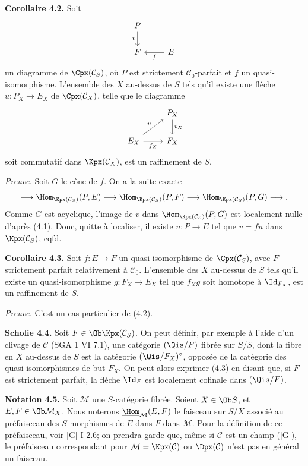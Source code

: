 \documentclass[11pt]{article}
\begin{document}
\textbf{Corollaire 4.2.} Soit
\[
\begin{tikzcd}
P \arrow[d,"v"'] \\
F & E \arrow[l,"f"]
\end{tikzcd}
\]
un diagramme de \(\Cpx(\mathcal C_S)\), où \(P\) est strictement \(\mathcal C_0\)-parfait et \(f\) un quasi-isomorphisme. L'ensemble des \(X\) au-dessus de \(S\) tels qu'il existe une flèche \(u:P_X\to E_X\) de \(\Cpx(\mathcal C_X)\), telle que le diagramme
\[
\begin{tikzcd}
& P_X \arrow[d,"v_X"]\\
E_X \arrow[r,"f_X"'] \arrow[ur,"u"] & F_X
\end{tikzcd}
\]
soit commutatif dans \(\Kpx(\mathcal C_X)\), est un raffinement de \(S\).

\emph{Preuve.} Soit \(G\) le cône de \(f\). On a la suite exacte
\[
  \longrightarrow \Hom_{\Kpx(\mathcal C_S)}(P,E)
  \longrightarrow \Hom_{\Kpx(\mathcal C_S)}(P,F)
  \longrightarrow \Hom_{\Kpx(\mathcal C_S)}(P,G)
  \longrightarrow .
\]
Comme \(G\) est acyclique, l'image de \(v\) dans \(\Hom_{\Kpx(\mathcal C_S)}(P,G)\) est localement nulle d'après (4.1). Donc, quitte à localiser, il existe \(u:P\to E\) tel que \(v=fu\) dans \(\Kpx(\mathcal C_S)\), cqfd.

\textbf{Corollaire 4.3.} Soit \(f:E\to F\) un quasi-isomorphisme de \(\Cpx(\mathcal C_S)\), avec \(F\) strictement parfait relativement à \(\mathcal C_0\). L'ensemble des \(X\) au-dessus de \(S\) tels qu'il existe un quasi-isomorphisme \(g:F_X\to E_X\) tel que \(f_Xg\) soit homotope à \(\Id_{F_X}\), est un raffinement de \(S\).

\emph{Preuve.} C'est un cas particulier de (4.2).

\textbf{Scholie 4.4.} Soit \(F\in\Ob\Kpx(\mathcal C_S)\). On peut définir, par exemple à l'aide d'un clivage de \(\mathcal C\) (SGA 1 VI 7.1), une catégorie \((\Qis/F)\) fibrée sur \(S/S\), dont la fibre en \(X\) au-dessus de \(S\) est la catégorie \((\Qis/F_X)^\circ\), opposée de la catégorie des quasi-isomorphismes de but \(F_X\). On peut alors exprimer (4.3) en disant que, si \(F\) est strictement parfait, la flèche \(\Id_F\) est localement cofinale dans \((\Qis/F)\).

\textbf{Notation 4.5.} Soit \(\mathcal M\) une \(S\)-catégorie fibrée. Soient \(X\in\Ob S\), et \(E,F\in\Ob\mathcal M_X\). Nous noterons \(\underline{\Hom}_{\mathcal M}(E,F)\) le faisceau sur \(S/X\) associé au préfaisceau des \(S\)-morphismes de \(E\) dans \(F\) dans \(\mathcal M\). Pour la définition de ce préfaisceau, voir [G] I 2.6; on prendra garde que, même si \(\mathcal C\) est un champ ([G]), le préfaisceau correspondant pour \(\mathcal M=\Kpx(\mathcal C)\) ou \(\Dpx(\mathcal C)\) n'est pas en général un faisceau.
\end{document}
